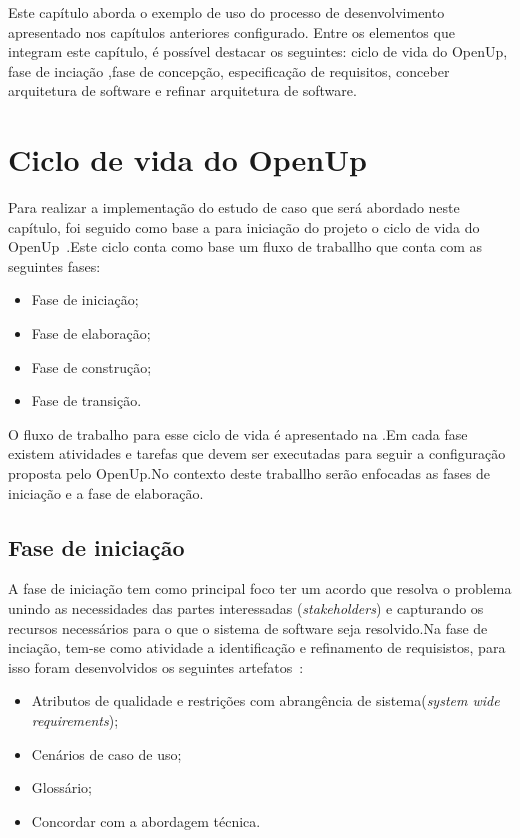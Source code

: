 Este capítulo aborda o exemplo de uso do processo de desenvolvimento apresentado nos capítulos anteriores configurado. Entre os elementos que integram este capítulo, é possível destacar os seguintes: ciclo de vida do OpenUp, fase de inciação ,fase de concepção, especificação de requisitos, conceber arquitetura de software e refinar arquitetura de software.

\section{Ciclo de vida do OpenUp}

Para realizar a implementação do estudo de caso que será abordado neste capítulo, foi seguido como base a para iniciação do projeto o ciclo de vida do OpenUp~\cite{openup}.Este ciclo conta como base um fluxo de traballho que conta com as seguintes fases:
\begin{itemize}
    \item Fase de iniciação;
    \item Fase de elaboração;
    \item Fase de construção;
    \item Fase de transição.
\end{itemize}

%

O fluxo de trabalho para esse ciclo de vida é apresentado na .Em cada fase existem atividades e tarefas que devem ser executadas para seguir a configuração proposta pelo OpenUp.No contexto deste traballho serão enfocadas as fases de iniciação e a fase de elaboração.

\subsection{Fase de iniciação}

A fase de iniciação tem como principal foco ter um acordo que resolva o problema unindo as necessidades das partes interessadas (\emph{stakeholders}) e capturando os recursos necessários para o que o sistema de software seja resolvido.Na fase de inciação, tem-se como atividade a identificação e refinamento de requisistos, para isso foram desenvolvidos os seguintes artefatos~\cite{openup}:

\begin{itemize}
    \item Atributos de qualidade e restrições com abrangência de sistema(\emph{system wide requirements});
    \item Cenários de caso de uso;
    \item Glossário;
    \item Concordar com a abordagem técnica.
\end{itemize}

